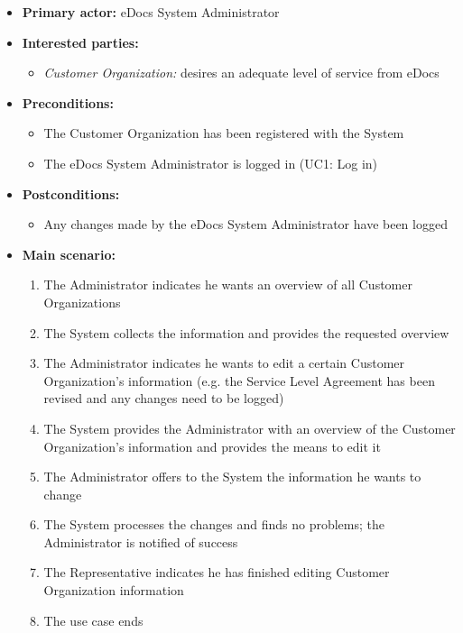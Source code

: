 \documentclass[a4paper,10pt]{article}
\begin{document}
\begin{itemize}
	\item \textbf{Primary actor:} eDocs System Administrator
	\item \textbf{Interested parties:} 
	\begin{itemize}
		\item \textit{Customer Organization:} desires an adequate level of service from eDocs
	\end{itemize}
	
	\item \textbf{Preconditions:}
	\begin{itemize}
		\item The Customer Organization has been registered with the System
		\item The eDocs System Administrator is logged in (UC1: Log in)
	\end{itemize}
	
	\item \textbf{Postconditions:}
	\begin{itemize}
		\item Any changes made by the eDocs System Administrator have been logged
	\end{itemize}
	
	\item \textbf{Main scenario:} 
	\begin{enumerate}
		\item The Administrator indicates he wants an overview of all Customer Organizations
		\item The System collects the information and provides the requested overview
		\item The Administrator indicates he wants to edit a certain Customer Organization's information (e.g. the Service Level Agreement has been revised and any changes need to be logged)
		\item The System provides the Administrator with an overview of the Customer Organization's information and provides the means to edit it
		\item The Administrator offers to the System the information he wants to change
		\item The System processes the changes and finds no problems; the Administrator is notified of success
		\item The Representative indicates he has finished editing Customer Organization information
		\item The use case ends
	\end{enumerate}
	

\end{itemize}
\end{document}
